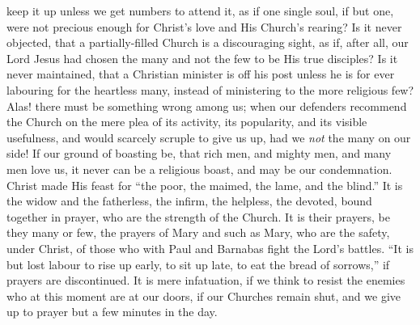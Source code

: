 keep it up unless we get numbers to attend it, as if one single soul,
if but one, were not precious enough for Christ's love and His
Church's rearing? Is it never objected, that a partially-filled
Church is a discouraging sight, as if, after all, our Lord Jesus had
chosen the many and not the few to be His true disciples? Is it never
maintained, that a Christian minister is off his post unless he is for
ever labouring for the heartless many, instead of ministering to the
more religious few? Alas! there must be something wrong among us; when
our defenders recommend the Church on the mere plea of its activity,
its popularity, and its visible usefulness, and would scarcely scruple
to give us up, had we \emph{not} the many on our side! If our ground
of boasting be, that rich men, and mighty men, and many men love us,
it never can be a religious boast, and may be our condemnation. Christ
made His feast for ``the poor, the maimed, the lame, and the
blind.'' It is the widow and the fatherless, the infirm, the
helpless, the devoted, bound together in prayer, who are the strength
of the Church. It is their prayers, be they many or few, the prayers
of Mary and such as Mary, who are the safety, under Christ, of those
who with Paul and Barnabas fight the Lord's battles. ``It is but
lost labour to rise up early, to sit up late, to eat the bread of
sorrows,'' if prayers are discontinued. It is mere infatuation, if
we think to resist the enemies who at this moment are at our doors, if
our Churches remain shut, and we give up to prayer but a few minutes
in the day.

